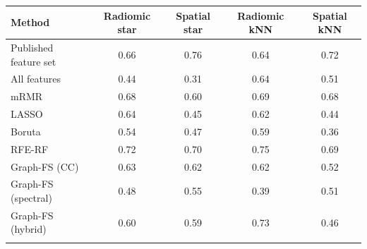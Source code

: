 \begin{tabular}{@{}lcccc@{}}
\toprule
Method & Radiomic star & Spatial star & Radiomic kNN & Spatial kNN \\
\midrule
Published feature set & 0.66 & 0.76 & 0.64 & 0.72 \\
All features & 0.44 & 0.31 & 0.64 & 0.51 \\
mRMR & 0.68 & 0.60 & 0.69 & 0.68 \\
LASSO & 0.64 & 0.45 & 0.62 & 0.44 \\
Boruta & 0.54 & 0.47 & 0.59 & 0.36 \\
RFE-RF & 0.72 & 0.70 & 0.75 & 0.69 \\
Graph-FS (CC) & 0.63 & 0.62 & 0.62 & 0.52 \\
Graph-FS (spectral) & 0.48 & 0.55 & 0.39 & 0.51 \\
Graph-FS (hybrid) & 0.60 & 0.59 & 0.73 & 0.46 \\
\botrule
\end{tabular}
